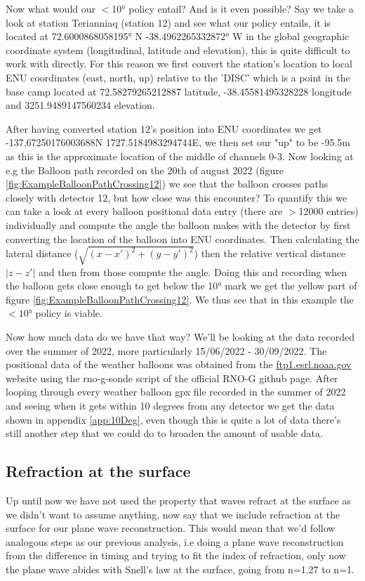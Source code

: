 Now what would our $<$10° policy entail? And is it even possible?  Say we take
a look at station Terianniaq (station 12) and see what our policy entails,
it is located at 72.6000868058195° N -38.4962265332872° W in the global geographic
coordinate system (longitudinal, latitude and elevation), this is quite
difficult to work with directly. For this reason we first convert the station's location to 
local ENU coordinates (east, north, up) relative to the 'DISC' which is a point in the base camp located at
72.58279265212887 latitude, -38.45581495328228 longitude and 3251.9489147560234 elevation.  

After having converted station 12's position into ENU coordinates we get
-137.67250176003688N 1727.5184983294744E, we then set our "up" to be -95.5m as
this is the approximate location of the middle of channels 0-3.  Now looking at
e.g the Balloon path recorded on the 20th of august 2022 (figure
\ref{fig:ExampleBalloonPathCrossing12}) we see that the balloon crosses paths
closely with detector 12, but how close was this encounter? To quantify this we
can take a look at every balloon positional data entry (there are $>$12000
entries) individually and compute the angle the balloon makes with the detector
by first converting the location of the balloon into ENU coordinates. Then
calculating the lateral distance ($\sqrt{(x-x')^2 + (y-y')^2}$) then the
relative vertical distance $|z - z'|$ and then from those compute the angle. Doing this and recording when the balloon
gets close enough to get below the 10° mark we get the yellow part of figure
\ref{fig:ExampleBalloonPathCrossing12}. We thus see that in this
example the $<10$° policy is viable.

Now how much data do we have that way? 
We'll be looking at the data recorded over the summer of
2022, more particularly 15/06/2022 - 30/09/2022.
The positional data of the weather balloons was obtained from the
\url{ftp1.esrl.noaa.gov} website using the rno-g-sonde script of the official
RNO-G github page. After looping through every weather
balloon gpx file recorded in the summer of 2022 and seeing when it gets
within 10 degrees from any detector we get the data shown in appendix \ref{app:10Deg}, even
though this is quite a lot of data there's still another step that we could do
to broaden the amount of usable data.
\subsection{Refraction at the surface}
Up until now we have not used the property that waves refract at the surface as
we didn't want to assume anything, now say that we include refraction at the
surface for our plane wave reconstruction. This would mean that we'd follow
analogous steps as our previous analysis, i.e doing a plane wave reconstruction
from the difference in timing and trying to fit the index of refraction, only
now the plane wave abides with Snell's law at the surface, going from n=1.27 to
n=1. 


